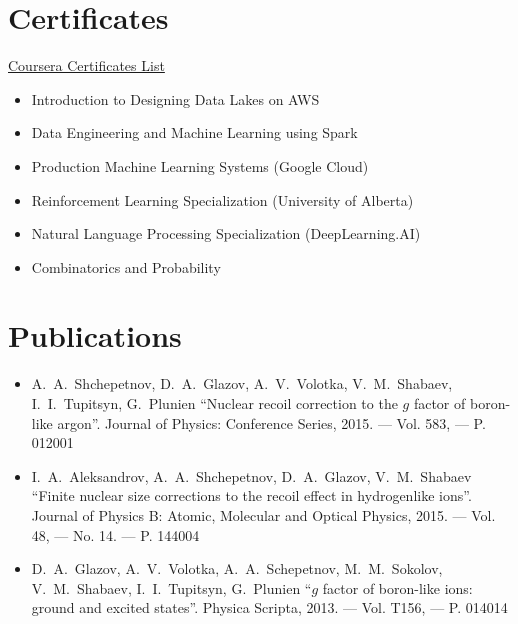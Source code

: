 \documentclass[10pt,a4paper]{article}
\newcommand{\verticalSpace}{0.3cm}
\begin{document}
	\newpage
	
	\section*{Certificates}	

        \href{https://www.coursera.org/user/18f9c12413a21ae354c0c5f94bc125c9}{Coursera Certificates List}

        \begin{itemize}
            \item Introduction to Designing Data Lakes on AWS
            \item Data Engineering and Machine Learning using Spark
            \item Production Machine Learning Systems (Google Cloud)
            \item Reinforcement Learning Specialization (University of Alberta)
            \item Natural Language Processing Specialization (DeepLearning.AI)
            \item Combinatorics and Probability
        \end{itemize}





		
	
	\section*{Publications}
	\begin{itemize}
		\item A.~A.~Shchepetnov, D.~A.~Glazov, A.~V.~Volotka, V.~M.~Shabaev, I.~I.~Tupitsyn, G.~Plunien 
			``Nuclear recoil correction to the $g$ factor of boron-like argon''. Journal of Physics: Conference Series, 2015. --- Vol. 583, --- P. 012001
		\item I.~A.~Aleksandrov, A.~A.~Shchepetnov, D.~A.~Glazov, V.~M.~Shabaev 
			``Finite nuclear size corrections to the recoil effect in hydrogenlike ions''. Journal of Physics B: Atomic, Molecular and Optical Physics, 2015. --- Vol. 48, --- No. 14. --- P. 144004		
		\item D.~A.~Glazov, A.~V.~Volotka, A.~A.~Schepetnov, M.~M.~Sokolov, V.~M.~Shabaev, I.~I.~Tupitsyn, G.~Plunien 
			``$g$ factor of boron-like ions: ground and excited states''. Physica Scripta, 2013. --- Vol. T156, --- P. 014014
	\end{itemize}
\end{document}

